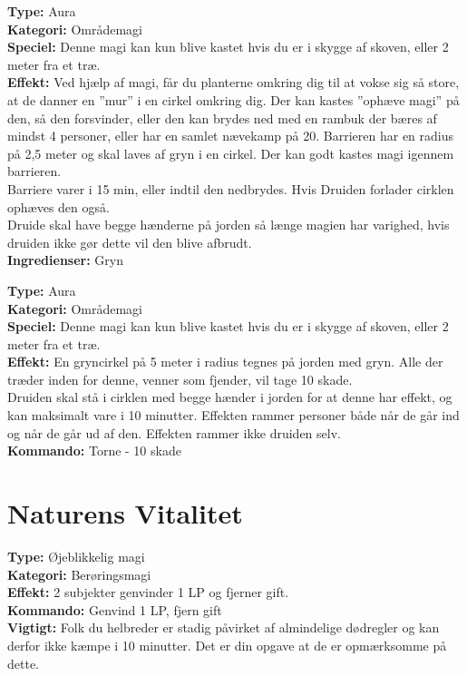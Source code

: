 \begin{nly*}
\textbf{Type:} Aura\\ 
\textbf{Kategori:} Områdemagi\\
\textbf{Speciel:} Denne magi kan kun blive kastet hvis du er i skygge af skoven, eller 2 meter fra et træ.\\
\textbf{Effekt:} Ved hjælp af magi, får du planterne omkring dig til at vokse sig så store, at de danner en ”mur” i en cirkel omkring dig. Der kan kastes ”ophæve magi” på den, så den forsvinder, eller den kan brydes ned med en rambuk der bæres af mindst 4 personer, eller har en samlet nævekamp på 20. Barrieren har en radius på 2,5 meter og skal laves af gryn i en cirkel. Der kan godt kastes magi igennem barrieren.\\
Barriere varer i 15 min, eller indtil den nedbrydes. Hvis Druiden forlader cirklen ophæves den også.\\
Druide skal have begge hænderne på jorden så længe magien har varighed, hvis druiden ikke gør dette vil den blive afbrudt.\\
\textbf{Ingredienser:} Gryn
\end{nly*}


\begin{nly*}
\textbf{Type:} Aura  \\
\textbf{Kategori:} Områdemagi\\
\textbf{Speciel:} Denne magi kan kun blive kastet hvis du er i skygge af skoven, eller 2 meter fra et træ.\\
\textbf{Effekt:} En gryncirkel på 5 meter i radius tegnes på jorden med gryn. Alle der træder inden for denne, venner som fjender, vil tage 10 skade.\\ 
Druiden skal stå i cirklen med begge hænder i jorden for at denne har effekt, og kan maksimalt vare i 10 minutter. Effekten rammer personer både når de går ind og når de går ud af den. Effekten rammer ikke druiden selv.\\
\textbf{Kommando:} Torne - 10 skade
\end{nly*}

\section*{Naturens Vitalitet}
\begin{nvit*}
\textbf{Type:} Øjeblikkelig magi \\
\textbf{Kategori:} Berøringsmagi \\
\textbf{Effekt:} 2 subjekter genvinder 1 LP og fjerner gift.\\
\textbf{Kommando:} Genvind 1 LP, fjern gift\\
\textbf{Vigtigt:} Folk du helbreder er stadig påvirket af almindelige dødregler og kan derfor ikke kæmpe i 10 minutter. Det er din opgave at de er opmærksomme på dette.
\end{nvit*}

